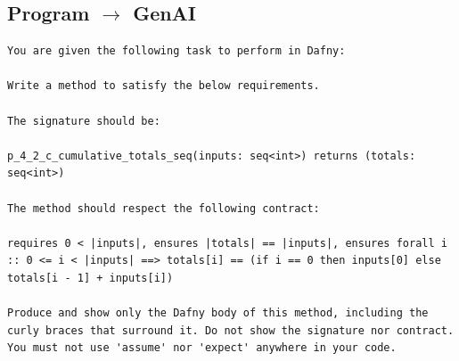 \documentclass{article}
\begin{document}
\subsection*{Program $\rightarrow$ GenAI}
\begin{lstlisting}
You are given the following task to perform in Dafny:

Write a method to satisfy the below requirements.

The signature should be:

p_4_2_c_cumulative_totals_seq(inputs: seq<int>) returns (totals: seq<int>)

The method should respect the following contract:

requires 0 < |inputs|, ensures |totals| == |inputs|, ensures forall i :: 0 <= i < |inputs| ==> totals[i] == (if i == 0 then inputs[0] else totals[i - 1] + inputs[i])

Produce and show only the Dafny body of this method, including the curly braces that surround it. Do not show the signature nor contract. You must not use 'assume' nor 'expect' anywhere in your code.
\end{lstlisting}
\end{document}
